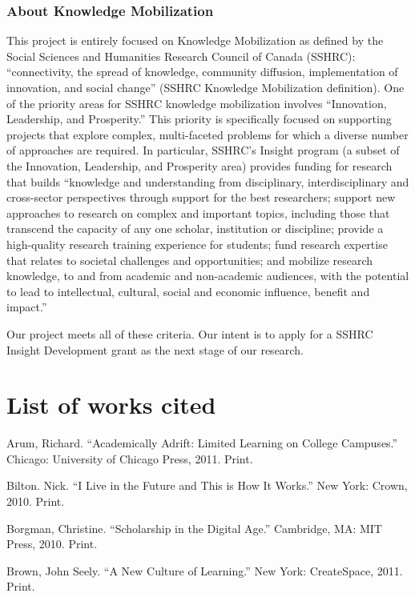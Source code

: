 \documentclass[letterpaper,10pt,headsepline]{scrreprt}
\begin{document}
\subsubsection{About Knowledge Mobilization}

This project is entirely focused on Knowledge Mobilization as defined by the
Social Sciences and Humanities Research Council of Canada (SSHRC):
``connectivity, the spread of knowledge, community diffusion, implementation
of innovation, and social change'' (SSHRC Knowledge Mobilization definition).
One of the priority areas for SSHRC knowledge mobilization involves ``Innovation,
Leadership, and Prosperity.'' This priority is specifically focused on
supporting projects that explore complex, multi-faceted problems for which a
diverse number of approaches are required. In particular, SSHRC's Insight
program (a subset of the Innovation, Leadership, and Prosperity area) provides
funding for research that builds ``knowledge and understanding from
disciplinary, interdisciplinary and cross-sector perspectives through
support for the best researchers; support new approaches to research on
complex and important topics, including those that transcend the capacity of
any one scholar, institution or discipline; provide a high-quality research
training experience for students; fund research expertise that relates to
societal challenges and opportunities; and mobilize research knowledge, to and
from academic and non-academic audiences, with the potential to lead to
intellectual, cultural, social and economic influence, benefit and impact.''

Our project meets all of these criteria. Our intent is to apply for a SSHRC
Insight Development grant as the next stage of our research.

\section{List of works cited}

Arum, Richard. ``Academically Adrift: Limited Learning on College Campuses.'' Chicago: University of Chicago Press, 2011. Print.

Bilton. Nick. ``I Live in the Future and This is How It Works.'' New York: Crown, 2010. Print.

Borgman, Christine. ``Scholarship in the Digital Age.'' Cambridge, MA: MIT Press, 2010. Print.

Brown, John Seely. ``A New Culture of Learning.'' New York: CreateSpace, 2011. Print.
\end{document}
